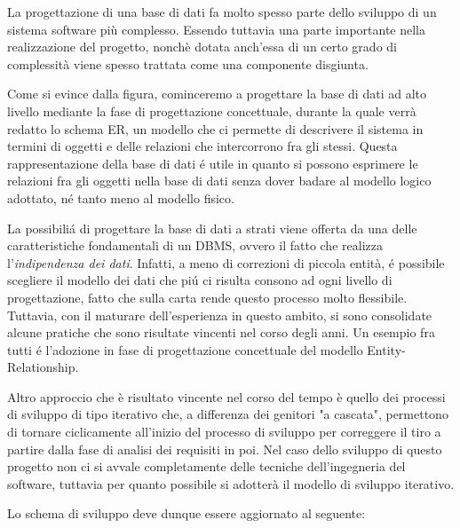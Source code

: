 \documentclass[12pt,a4paper,onecolumn,x11names]{article}
\begin{document}
	\begin{flushleft}
		La progettazione di una base di dati fa molto spesso parte dello sviluppo di un sistema software più complesso. Essendo tuttavia una parte importante nella realizzazione del progetto, nonchè dotata anch'essa di un certo grado di complessità viene spesso trattata come una componente disgiunta.\newline
		
		Come si evince dalla figura, cominceremo a progettare la base di dati ad alto livello mediante la fase di progettazione concettuale, durante la quale verrà redatto lo schema ER, un modello che ci permette di descrivere il sistema in termini di oggetti e delle relazioni che intercorrono fra gli stessi. Questa rappresentazione della base di dati \'{e} utile in quanto si possono  esprimere le relazioni fra gli oggetti nella base di dati senza dover badare al modello logico adottato, n\'{e} tanto meno al modello fisico.\newline
		
		La possibili\'{a} di progettare la base di dati a strati viene offerta da una delle caratteristiche fondamentali di un DBMS, ovvero il fatto che realizza l'\textit{indipendenza dei dati}. Infatti, a meno di correzioni di piccola entità, \'{e} possibile scegliere il modello dei dati che pi\'{u} ci risulta consono ad ogni livello di progettazione, fatto che sulla carta rende questo processo molto flessibile. Tuttavia, con il maturare dell'esperienza in questo ambito, si sono consolidate alcune pratiche che sono risultate vincenti nel corso degli anni. Un esempio fra tutti \'{e} l'adozione in fase di progettazione concettuale del modello Entity-Relationship.\newline
		
		Altro approccio che è risultato vincente nel corso del tempo è quello dei processi di sviluppo di tipo iterativo che, a differenza dei genitori "a cascata", permettono di tornare ciclicamente all'inizio del processo di sviluppo per correggere il tiro a partire dalla fase di analisi dei requisiti in poi. Nel caso dello sviluppo di questo progetto non ci si avvale completamente delle tecniche dell'ingegneria del software, tuttavia per quanto possibile si adotterà il modello di sviluppo iterativo.
		
		Lo schema di sviluppo deve dunque essere aggiornato al seguente:
		

\end{flushleft}
\end{document}
